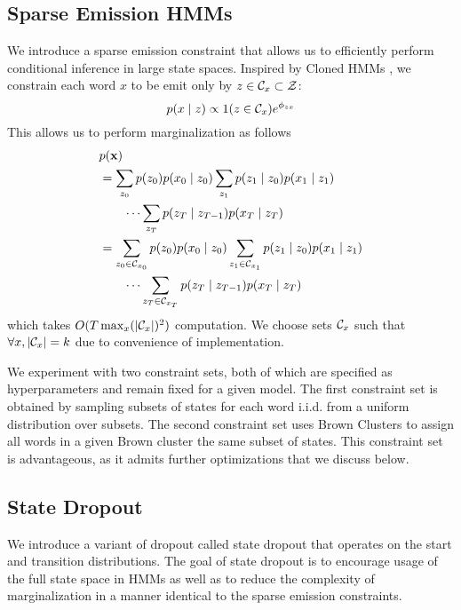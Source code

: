 \documentclass[11pt,a4paper]{article}
\begin{document}
\subsection{Sparse Emission HMMs}
We introduce a sparse emission constraint that allows us to
efficiently perform conditional inference in large state spaces.
Inspired by Cloned HMMs \citep{dedieu2019learning},
we constrain each word $x$ to be emit only by $z \in \mathcal{C}_x \subset \mathcal{Z}$:
\begin{equation}
\label{eqn:sparse_emission}
p(x \mid z) \propto 1(z \in \mathcal{C}_x)e^{\phi_{zx}}
\end{equation}
This allows us to perform marginalization as follows
\begin{equation}
\label{eqn:sparse_marginalization}
\begin{aligned}
&p(\mathbf{x})\\
&= \sum_{z_0} p(z_0)p(x_0 \mid z_0)
    \sum_{z_1}p(z_1\mid z_0)p(x_1 \mid z_1)\\
    &\qquad\cdots
    \sum_{z_T}p(z_T \mid z_{T-1})p(x_T \mid z_T)\\
&= \sum_{z_0 \in \mathcal{C}_{x_0}} p(z_0)p(x_0 \mid z_0)
    \sum_{z_1 \in \mathcal{C}_{x_1}} p(z_1\mid z_0)p(x_1 \mid z_1)\\
    &\qquad\cdots
    \sum_{z_T \in \mathcal{C}_{x_T}} p(z_T \mid z_{T-1})p(x_T \mid z_T)
\end{aligned}
\end{equation}
which takes $O(T \max_x(|\mathcal{C}_x|)^2)$ computation.
We choose sets $\mathcal{C}_x$ such that $\forall x, |\mathcal{C}_x| = k$
due to convenience of implementation.

We experiment with two constraint sets, both of which are specified 
as hyperparameters and remain fixed for a given model.
The first constraint set is obtained by sampling subsets of
states for each word i.i.d. from a uniform distribution over subsets.
The second constraint set uses Brown Clusters \citep{brown1992}
to assign all words in a given Brown cluster the same subset of states.
This constraint set is advantageous, as it admits further optimizations
that we discuss below.


\subsection{State Dropout}
We introduce a variant of dropout called state dropout that operates on the
start and transition distributions.
The goal of state dropout is to encourage usage of the full state space in HMMs
as well as to reduce the complexity of marginalization in a manner
identical to the sparse emission constraints.
\end{document}
